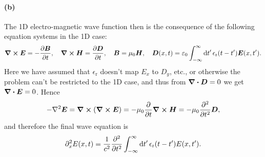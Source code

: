 \documentclass[hyperref, a4paper]{article}
\newcommand{\epsr}{\epsilon_{\text{r}}}
\begin{document}
\paragraph{(b)} The 1D electro-magnetic wave function then
is the consequence of the following equation systems
in the 1D case:
\begin{equation}
    \curl{\vb*{E}} = - \pdv{\vb*{B}}{t} , \quad 
    \curl{\vb*{H}} = \pdv{\vb*{D}}{t}, \quad 
    \vb*{B} = \mu_0 \vb*{H}, \quad 
    \vb*{D}(x, t) = \varepsilon_0 \int_{-\infty}^{\infty} \dd{t'} 
    \epsr(t - t') \vb*{E}(x, t').
\end{equation}
Here we have assumed that $\epsr$ doesn't map $E_x$ to $D_y$, etc.,
or otherwise the problem can't be restricted to the 1D case,
and thus from $\div{\vb*{D}} = 0$ we get $\div{\vb*{E}} = 0$.
Hence 
\begin{equation}
    \begin{aligned}
        - \laplacian \vb*{E} = \curl{(\curl{\vb*{E}})} = 
        - \mu_0 \pdv{t} \curl{\vb*{H}}
        = - \mu_0 \pdv[2]{t} \vb*{D},
    \end{aligned}
\end{equation}
and therefore the final wave equation is 
\begin{equation}
    \partial_x^2 E(x, t) = \frac{1}{c^2} \pdv[2]{t} 
    \int_{-\infty}^{\infty} \dd{t'} \epsr(t - t') E(x, t').
    \label{eq:wave-eq-retarded}
\end{equation}
\end{document}
